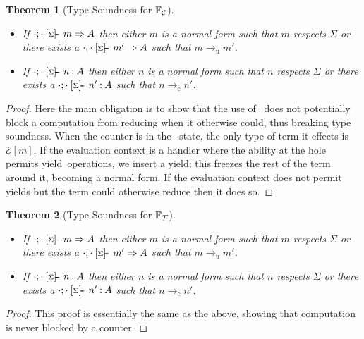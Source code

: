 \documentclass[msc,deptreport,cs]{infthesis} %
\newtheorem{theorem}{Theorem}
\newcommand\countingfrank{$\mathbb{F}_{\cal{C}}$}
\newcommand\treefrank{$\mathbb{F}_{\cal{T}}$}
\newcommand{\yieldc}{{\color{blue}{\textsf{yield}}}}
\newcommand\yield{\textsf{yield}\xspace}
\newcommand{\sigentails}[1]{\mathbin{[{\text{\scriptsize ${#1}$}}]\hspace{-0.4ex}\text{-\!-}}\,}
\newcommand{\inferbase}[5]{#1; #3 \mathbin{#2} {#4} \Rightarrow {#5}}
\newcommand{\checkbase}[5]{#1; #3 \mathbin{#2} #5 \mathbin{:} #4}
\newcommand{\makes}[5]{\inferbase{#1}{\sigentails{#3}}{#2}{#4}{#5}}
\newcommand{\has}[5]{\checkbase{#1}{\sigentails{#3}}{#2}{#4}{#5}}
\newcommand{\infers}{\makes}
\newcommand{\checks}{\has}
\newcommand{\sigs}{\Sigma}
\newcommand{\EC}{\mathcal{E}}
\newcommand{\stepstou}{\longrightarrow_{\mathrm{u}}}
\newcommand{\stepstoc}{\longrightarrow_{\mathrm{c}}}
\begin{document}
\begin{theorem}[Type Soundness for \countingfrank]~
\begin{itemize}
\\
\item If $\infers{\cdot}{\cdot}{\sigs}{m}{A}$ then either $m$ is a normal form
  such that $m$ respects $\sigs$ or there exists a
  $\infers{\cdot}{\cdot}{\sigs}{m'}{A}$ such that $m \stepstou m'$.
\item If $\checks{\cdot}{\cdot}{\sigs}{A}{n}$ then either $n$ is a normal form
  such that $n$ respects $\sigs$ or there exists a
  $\checks{\cdot}{\cdot}{\sigs}{A}{n'}$ such that $n \stepstoc n'$.
\end{itemize}
\end{theorem}
\begin{proof}

  Here the main obligation is to show that the use of \yieldc~does not
  potentially block a computation from reducing when it otherwise could, thus
  breaking type soundness. When the counter is in the \yieldc~state, the only
  type of term it effects is $\EC[m]$. If the evaluation context is a handler
  where the ability at the hole permits \yield~operations, we insert a yield;
  this freezes the rest of the term around it, becoming a normal form. If the
  evaluation context does not permit yields but the term could otherwise reduce
  then it does so.
\end{proof}


\begin{theorem}[Type Soundness for \treefrank]~
\begin{itemize}
\\
\item If $\infers{\cdot}{\cdot}{\sigs}{m}{A}$ then either $m$ is a normal form
  such that $m$ respects $\sigs$ or there exists a
  $\infers{\cdot}{\cdot}{\sigs}{m'}{A}$ such that $m \stepstou m'$.
\item If $\checks{\cdot}{\cdot}{\sigs}{A}{n}$ then either $n$ is a normal form
  such that $n$ respects $\sigs$ or there exists a
  $\checks{\cdot}{\cdot}{\sigs}{A}{n'}$ such that $n \stepstoc n'$.
\end{itemize}
\end{theorem}
\begin{proof}
  This proof is essentially the same as the above, showing that computation is
  never blocked by a counter.
\end{proof}
\end{document}
